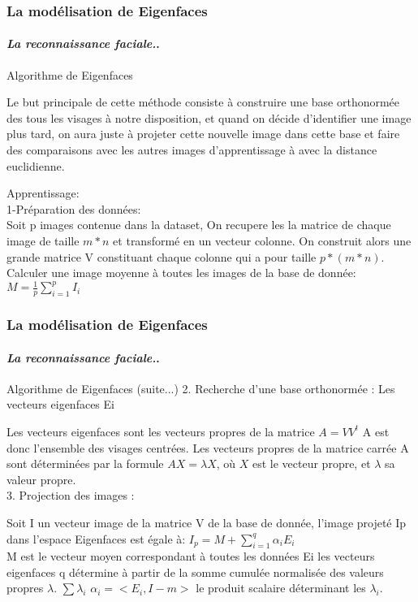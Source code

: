 \documentclass{beamer}
\begin{document}
	\begin{frame}
		\frametitle{La modélisation de Eigenfaces}
		\framesubtitle{\textit{La reconnaissance faciale.}.}
		\begin{block}{Algorithme de Eigenfaces}
\par Le but principale de cette méthode consiste à construire une base orthonormée des tous les visages à notre disposition, et quand on décide d'identifier une image plus tard, on aura juste à projeter cette nouvelle image dans cette base et faire des comparaisons avec les autres images d'apprentissage à avec la distance euclidienne.
\par Apprentissage:\\
1-Préparation des données:\\
Soit p images contenue dans la dataset,
On recupere les la matrice de chaque image de taille $m*n$ et transformé en un vecteur colonne. 
On construit alors une grande matrice V constituant chaque colonne qui a pour taille $p*(m*n)$.
Calculer une image moyenne à toutes les images de la base de donnée:\\
 $M = \frac{1}{p}\sum_{i=1}^{p} I_{i}$
		\end{block}
	\end{frame}
	\begin{frame}
		\frametitle{La modélisation de Eigenfaces}
		\framesubtitle{\textit{La reconnaissance faciale.}.}
		\begin{block}{Algorithme de Eigenfaces (suite...)}
2. Recherche d’une base orthonormée : Les vecteurs eigenfaces Ei\\
\par Les vecteurs eigenfaces sont les vecteurs propres de la matrice 
$A=VV^{t}$
A est donc l'ensemble des visages centrées.
Les vecteurs propres de la matrice carrée A sont déterminées par la formule 
$AX=\lambda X$, où $X$ est le vecteur propre, et $\lambda$ sa valeur propre.\\

3. Projection des images :\\
\par Soit I un vecteur image de la matrice V de la base de donnée, l’image projeté Ip dans l’espace Eigenfaces est égale à:
$I_{p} = M +\sum_{i=1}^{q} \alpha_{i}E_{i}$\\
M est le vecteur moyen correspondant à toutes les données
Ei les vecteurs eigenfaces
q détermine à partir de la somme cumulée normalisée des valeurs propres $\lambda$.
$\sum \lambda_{i}$
$\alpha_{i}= <E_{i}, I-m>$ le produit scalaire  déterminant les $\lambda_{i}$.\\

		\end{block}
	\end{frame}
\end{document}

